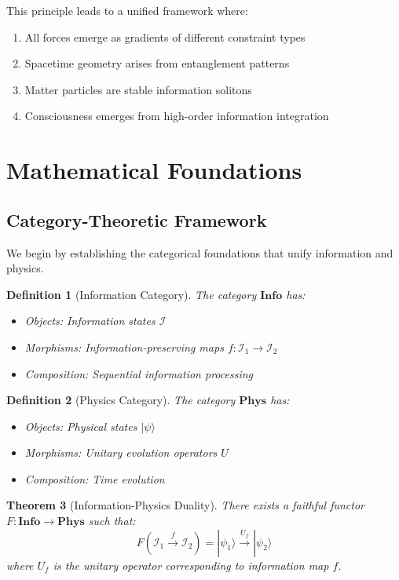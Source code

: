 \documentclass[12pt,a4paper]{article}
\newtheorem{theorem}{Theorem}[section]
\newtheorem{definition}[theorem]{Definition}
\begin{document}
This principle leads to a unified framework where:
\begin{enumerate}
\item All forces emerge as gradients of different constraint types
\item Spacetime geometry arises from entanglement patterns
\item Matter particles are stable information solitons
\item Consciousness emerges from high-order information integration
\end{enumerate}

\section{Mathematical Foundations}

\subsection{Category-Theoretic Framework}

We begin by establishing the categorical foundations that unify information and physics.

\begin{definition}[Information Category]
The category $\mathbf{Info}$ has:
\begin{itemize}
\item Objects: Information states $\mathcal{I}$
\item Morphisms: Information-preserving maps $f: \mathcal{I}_1 \to \mathcal{I}_2$
\item Composition: Sequential information processing
\end{itemize}
\end{definition}

\begin{definition}[Physics Category]
The category $\mathbf{Phys}$ has:
\begin{itemize}
\item Objects: Physical states $|\psi\rangle$
\item Morphisms: Unitary evolution operators $U$
\item Composition: Time evolution
\end{itemize}
\end{definition}

\begin{theorem}[Information-Physics Duality]
There exists a faithful functor $F: \mathbf{Info} \to \mathbf{Phys}$ such that:
\begin{equation}
F(\mathcal{I}_1 \xrightarrow{f} \mathcal{I}_2) = |\psi_1\rangle \xrightarrow{U_f} |\psi_2\rangle
\end{equation}
where $U_f$ is the unitary operator corresponding to information map $f$.
\end{theorem}
\end{document}
